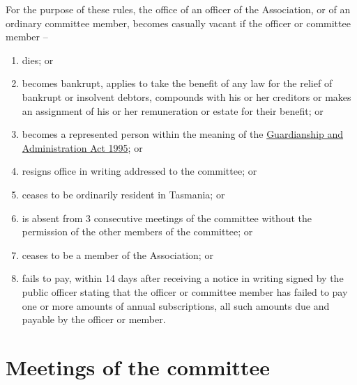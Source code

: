 \documentclass[a4paper,11pt]{article}
\begin{document}
For the purpose of these rules, the office of an officer of the Association, or of an ordinary committee member, becomes casually vacant if the officer or committee member --
\begin{enumerate}
	\item dies; or
	\item becomes bankrupt, applies to take the benefit of any law for the relief of bankrupt or insolvent debtors, compounds with his or her creditors or makes an assignment of his or her remuneration or estate for their benefit; or
	\item becomes a represented person within the meaning of the \href{https://www.legislation.tas.gov.au/view/html/inforce/current/act-1995-044}{Guardianship and Administration Act 1995}; or
	\item resigns office in writing addressed to the committee; or
	\item ceases to be ordinarily resident in Tasmania; or
	\item is absent from 3 consecutive meetings of the committee without the permission of the other members of the committee; or
	\item ceases to be a member of the Association; or
	\item fails to pay, within 14 days after receiving a notice in writing signed by the public officer stating that the officer or committee member has failed to pay one or more amounts of annual subscriptions, all such amounts due and payable by the officer or member.
\end{enumerate}

\section{Meetings of the committee}
\label{rule:committeeMeetings}
\end{document}

